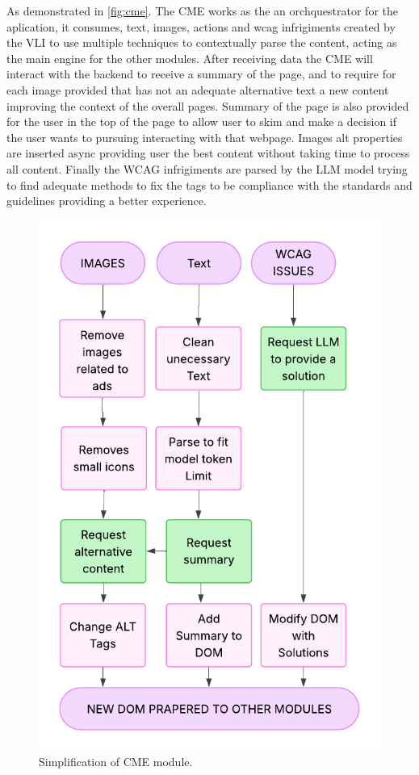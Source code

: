 \documentclass[conference]{IEEEtran}
\begin{document}
As demonstrated in \autoref{fig:cme}. The CME works as the an orchquestrator for the aplication, it consumes, text, images, actions and wcag infrigiments created by the VLI to use multiple techniques to contextually parse the content, acting as the main engine for the other modules. After receiving data the CME will interact with the backend to receive a summary of the page, and to require for each image provided that has not an adequate alternative text a new content improving the context of the overall pages. Summary of the page is also provided for the user in the top of the page to allow user to skim and make a decision if the user wants to pursuing interacting with that webpage. Images alt properties are inserted async providing user the best content without taking time to process all content. Finally the WCAG infrigiments are parsed by the LLM model trying to find adequate methods to fix the tags to be compliance with the standards and guidelines providing a better experience.

\begin{figure}[h]
\centering
\includegraphics[width=\columnwidth]{images/CME.pdf}
\caption{Simplification of CME module.}
\label{fig:cme}
\end{figure}
\end{document}
